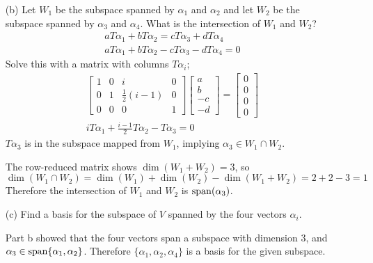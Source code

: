\documentclass{article}
\begin{document}
\begin{enumerate}[listparindent=\parindent]
\begin{enumerate}[listparindent=\parindent]
        \item[(b)] Let \(W_1\) be the subspace spanned by \(\alpha_1\) and \(\alpha_2\)
            and let \(W_2\) be the subspace spanned by \(\alpha_3\) and \(\alpha_4\).
            What is the intersection of \(W_1\) and \(W_2\)?
            \begin{gather*}
                aT\alpha_1 + bT\alpha_2 = cT\alpha_3 + dT\alpha_4 \\
                aT\alpha_1 + bT\alpha_2 - cT\alpha_3 - dT\alpha_4 = 0
            \end{gather*}
            Solve this with a matrix with columns \(T\alpha_i\);
            \begin{gather*}
                \begin{bmatrix}
                    1 & 0 & i & 0 \\
                    0 & 1 & \frac{1}{2}(i - 1) & 0 \\
                    0 & 0 & 0 & 1
                \end{bmatrix}
                \begin{bmatrix} a \\ b \\ -c \\ -d \end{bmatrix}
                =
                \begin{bmatrix} 0 \\ 0 \\ 0 \\ 0 \end{bmatrix} \\
                iT\alpha_1 + \frac{i - 1}{2}T\alpha_2 - T\alpha_3 = 0
            \end{gather*}
            \(T\alpha_3\) is in the subspace mapped from \(W_1\), implying \(\alpha_3 \in W_1 \cap W_2\).

            The row-reduced matrix shows \(\dim(W_1 + W_2) = 3\), so \[ \dim(W_1 \cap W_2) = \dim(W_1) + \dim(W_2) - \dim(W_1 + W_2) = 2 + 2 - 3 = 1 \]
            Therefore the intersection of \(W_1\) and \(W_2\) is \(\operatorname{span} (\alpha_3)\).

        \item[(c)] Find a basis for the subspace of \(V\) spanned by the four vectors \(\alpha_i\).

            Part b showed that the four vectors span a subspace with dimension 3, and \(\alpha_3 \in \operatorname{span}\{\alpha_1, \alpha_2\}\).
            Therefore \(\{\alpha_1, \alpha_2, \alpha_4\}\) is a basis for the given subspace.


\end{enumerate}
\end{enumerate}
\end{document}
